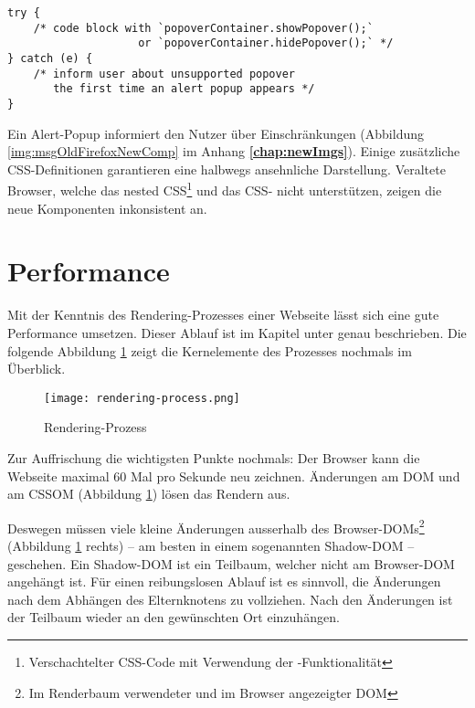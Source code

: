 \begin{lstlisting}[style = htmlcssjs, caption = Workaround für ältere Browser, label = code:popoverWorkaround]
try {
    /* code block with `popoverContainer.showPopover();`
                    or `popoverContainer.hidePopover();` */
} catch (e) {
    /* inform user about unsupported popover 
       the first time an alert popup appears */
}
\end{lstlisting}

Ein Alert-Popup informiert den Nutzer über Einschränkungen (Abbildung \ref{img:msgOldFirefoxNewComp} im Anhang \textbf{\ref{chap:newImgs}}). 
Einige zusätzliche CSS-Definitionen garantieren eine halbwegs ansehnliche Darstellung. 
Veraltete Browser, welche das nested CSS\footnote{
    Verschachtelter CSS-Code mit Verwendung der \codestyle{\&}-Funktionalität
} und das CSS- nicht unterstützen, zeigen die neue Komponenten inkonsistent an. 


\section{Performance}
\label{sec:performance}

Mit der Kenntnis des Rendering-Prozesses einer Webseite lässt sich eine gute Performance umsetzen. 
Dieser Ablauf ist im Kapitel \textbf{} unter \textbf{} genau beschrieben. 
Die folgende Abbildung \ref{img:renderingProcessRecap} zeigt die Kernelemente des Prozesses nochmals im Überblick. 

\begin{figure}[!htb]
    \centering
    \texttt{[image: rendering-process.png]}
    \caption{\centering Rendering-Prozess}
    \label{img:renderingProcessRecap}
\end{figure}

Zur Auffrischung die wichtigsten Punkte nochmals: 
Der Browser kann die Webseite maximal 60 Mal pro Sekunde neu zeichnen. 
Änderungen am DOM und am CSSOM (Abbildung \ref{img:renderingProcessRecap}) lösen das Rendern aus. 

Deswegen müssen viele kleine Änderungen ausserhalb des Browser-DOMs\footnote{
    Im Renderbaum verwendeter und im Browser angezeigter DOM
} (Abbildung \ref{img:renderingProcessRecap} rechts) – am besten in einem sogenannten Shadow-DOM – geschehen. 
Ein Shadow-DOM ist ein Teilbaum, welcher nicht am Browser-DOM angehängt ist. 
Für einen reibungslosen Ablauf ist es sinnvoll, die Änderungen nach dem Abhängen des Elternknotens zu vollziehen. 
Nach den Änderungen ist der Teilbaum wieder an den gewünschten Ort einzuhängen. 

